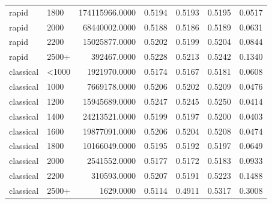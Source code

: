 \begin{tabular}{llrrrrr}
rapid & 1800 & 174115966.0000 & 0.5194 & 0.5193 & 0.5195 & 0.0517 \\
rapid & 2000 & 68440002.0000 & 0.5188 & 0.5186 & 0.5189 & 0.0631 \\
rapid & 2200 & 15025877.0000 & 0.5202 & 0.5199 & 0.5204 & 0.0844 \\
rapid & 2500+ & 392467.0000 & 0.5228 & 0.5213 & 0.5242 & 0.1340 \\
classical & <1000 & 1921970.0000 & 0.5174 & 0.5167 & 0.5181 & 0.0608 \\
classical & 1000 & 7669178.0000 & 0.5206 & 0.5202 & 0.5209 & 0.0476 \\
classical & 1200 & 15945689.0000 & 0.5247 & 0.5245 & 0.5250 & 0.0414 \\
classical & 1400 & 24213521.0000 & 0.5199 & 0.5197 & 0.5200 & 0.0403 \\
classical & 1600 & 19877091.0000 & 0.5206 & 0.5204 & 0.5208 & 0.0474 \\
classical & 1800 & 10166049.0000 & 0.5195 & 0.5192 & 0.5197 & 0.0649 \\
classical & 2000 & 2541552.0000 & 0.5177 & 0.5172 & 0.5183 & 0.0933 \\
classical & 2200 & 310593.0000 & 0.5207 & 0.5191 & 0.5223 & 0.1488 \\
classical & 2500+ & 1629.0000 & 0.5114 & 0.4911 & 0.5317 & 0.3008 \\
\bottomrule
\end{tabular}
